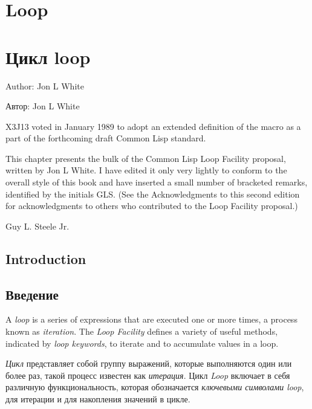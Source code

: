 
\clearpage\def\pagestatus{FINAL PROOF}

\chapter{Loop}
\label{LOOP}

\chapter{Цикл loop}
\label{LOOP}

Author: Jon L White

Автор: Jon L White

\begin{new}
\prefaceword
X3J13 voted in January 1989
to adopt an extended definition of the  macro
as a part of the forthcoming draft Common Lisp standard.
\end{new}
This chapter presents the bulk of the Common Lisp
Loop Facility proposal, written by Jon L White.  I have
edited it only very lightly
to conform to the overall style of this book and have inserted a small
number of bracketed remarks, identified by the initials GLS.
(See the Acknowledgments to this second edition for
acknowledgments to others who contributed to the Loop Facility proposal.)

Guy L. Steele Jr.

\section{Introduction}

\section{Введение}

A \emph{loop\/} is a series of expressions that are executed one or more times,
a process known as \emph{iteration}.
The \emph{Loop Facility\/} defines a
variety of useful methods, indicated by
\emph{loop keywords}, to iterate and to
accumulate values in a loop.

\emph{Цикл} представляет собой группу выражений, которые выполняются
один или более раз, такой процесс известен как \emph{итерация}.
Цикл \emph{Loop} включает в себя различную функциональность, которая
обозначается \emph{ключевыми символами loop}, для итерации и для
накопления значений в цикле.

